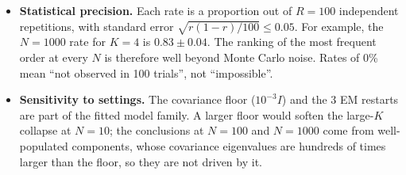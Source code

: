 \begin{itemize}
\item \textbf{Statistical precision.} Each rate is a proportion out of $R=100$ independent repetitions, with standard error $\sqrt{r(1-r)/100}\le0.05$. For example, the $N=1000$ rate for $K=4$ is $0.83\pm0.04$. The ranking of the most frequent order at every $N$ is therefore well beyond Monte Carlo noise. Rates of 0\% mean ``not observed in 100 trials'', not ``impossible''.
\item \textbf{Sensitivity to settings.} The covariance floor ($10^{-3}I$) and the 3 EM restarts are part of the fitted model family. A larger floor would soften the large-$K$ collapse at $N=10$; the conclusions at $N=100$ and $N=1000$ come from well-populated components, whose covariance eigenvalues are hundreds of times larger than the floor, so they are not driven by it.
\end{itemize}
